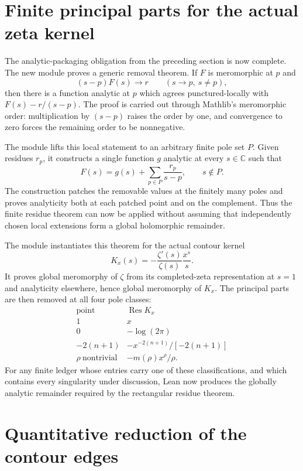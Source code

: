 \documentclass[11pt,a4paper]{article}
\begin{document}
\section{Finite principal parts for the actual zeta kernel}

The analytic-packaging obligation from the preceding section is now complete.
The new module  proves a
generic removal theorem.  If $F$ is meromorphic at $p$ and
\[
  (s-p)F(s)\longrightarrow r
  \qquad(s\to p,\ s\ne p),
\]
then there is a function analytic at $p$ which agrees punctured-locally with
$F(s)-r/(s-p)$.  The proof is carried out through Mathlib's meromorphic order:
multiplication by $(s-p)$ raises the order by one, and convergence to zero
forces the remaining order to be nonnegative.

The module  lifts this local
statement to an arbitrary finite pole set $P$.  Given residues $r_p$, it
constructs a single function $g$ analytic at every $s\in\mathbb C$ such that
\[
  F(s)=g(s)+\sum_{p\in P}\frac{r_p}{s-p},\qquad s\notin P.
\]
The construction patches the removable values at the finitely many poles and
proves analyticity both at each patched point and on the complement.  Thus the
finite residue theorem can now be applied without assuming that independently
chosen local extensions form a global holomorphic remainder.

The module  instantiates
this theorem for the actual contour kernel
\[
  K_x(s)=-\frac{\zeta'(s)}{\zeta(s)}\frac{x^s}{s}.
\]
It proves global meromorphy of $\zeta$ from its completed-zeta representation
at $s=1$ and analyticity elsewhere, hence global meromorphy of $K_x$.  The
principal parts are then removed at all four pole classes:
\[
\begin{array}{c|c}
  \text{point} & \operatorname*{Res} K_x \\
  \hline
  1 & x \\
  0 & -\log(2\pi) \\
  -2(n+1) & -x^{-2(n+1)}/[-2(n+1)] \\
  \rho\ \text{nontrivial} & -m(\rho)x^\rho/\rho.
\end{array}
\]
For any finite ledger whose entries carry one of these classifications, and
which contains every singularity under discussion, Lean now produces the
globally analytic remainder required by the rectangular residue theorem.

\section{Quantitative reduction of the contour edges}
\end{document}
